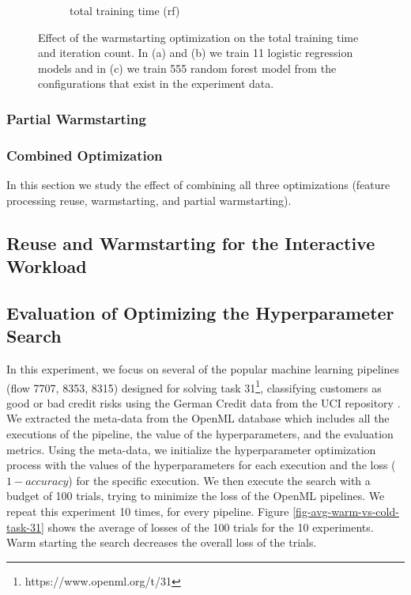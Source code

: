 \begin{figure}
\begin{subfigure}{.5\linewidth}
  \caption{total training time (rf)}
  \label{fig:sub1}
\end{subfigure}
\caption{Effect of the warmstarting optimization on the total training time and iteration count. In (a) and (b) we train 11 logistic regression models and in (c) we train 555 random forest model from the configurations that exist in the experiment data.}
\label{evaluation-warmstarting-figure}
\end{figure}

\subsubsection{Partial Warmstarting}

\subsubsection{Combined Optimization}
In this section we study the effect of combining all three optimizations (feature processing reuse, warmstarting, and partial warmstarting).

\subsection{Reuse and Warmstarting for the Interactive Workload}

\subsection{Evaluation of Optimizing the Hyperparameter Search}

In this experiment, we focus on several of the popular machine learning pipelines (flow 7707, 8353, 8315) designed for solving task 31\footnote{https://www.openml.org/t/31}, classifying customers as good or bad credit risks using the German Credit data from the UCI repository \cite{Dua:2017}.
We extracted the meta-data from the OpenML database which includes all the executions of the pipeline, the value of the hyperparameters, and the evaluation metrics.
Using the meta-data, we initialize the hyperparameter optimization process with the values of the hyperparameters for each execution and the loss ($1- accuracy$) for the specific execution.
We then execute the search with a budget of 100 trials, trying to minimize the loss of the OpenML pipelines.
We repeat this experiment 10 times, for every pipeline.
Figure \ref{fig-avg-warm-vs-cold-task-31} shows the average of losses of the 100 trials for the 10 experiments.
Warm starting the search decreases the overall loss of the trials.

